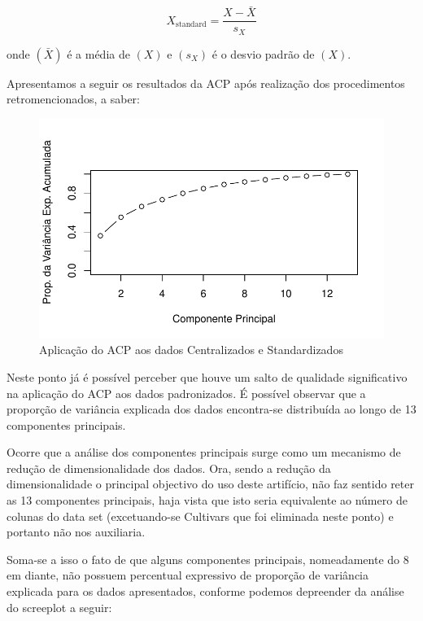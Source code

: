 \documentclass[
  letterpaper,
  DIV=11,
  numbers=noendperiod]{scrartcl}
\begin{document}
\[ 
X_{\text{standard}} = \frac{X - \bar{X}}{s_X}
\]

onde \((\bar{X})\) é a média de \((X)\) e \((s_X)\) é o desvio padrão de
\((X)\).

Apresentamos a seguir os resultados da ACP após realização dos
procedimentos retromencionados, a saber:

\begin{figure}[H]

{\centering \includegraphics{wines_analysis_files/figure-pdf/unnamed-chunk-20-1.pdf}

}

\caption{Aplicação do ACP aos dados Centralizados e Standardizados}

\end{figure}%

Neste ponto já é possível perceber que houve um salto de qualidade
significativo na aplicação do ACP aos dados padronizados. É possível
observar que a proporção de variância explicada dos dados encontra-se
distribuída ao longo de 13 componentes principais.

Ocorre que a análise dos componentes principais surge como um mecanismo
de redução de dimensionalidade dos dados. Ora, sendo a redução da
dimensionalidade o principal objectivo do uso deste artifício, não faz
sentido reter as 13 componentes principais, haja vista que isto seria
equivalente ao número de colunas do data set (excetuando-se Cultivars
que foi eliminada neste ponto) e portanto não nos auxiliaria.

Soma-se a isso o fato de que alguns componentes principais, nomeadamente
do 8 em diante, não possuem percentual expressivo de proporção de
variância explicada para os dados apresentados, conforme podemos
depreender da análise do screeplot a seguir:
\end{document}
